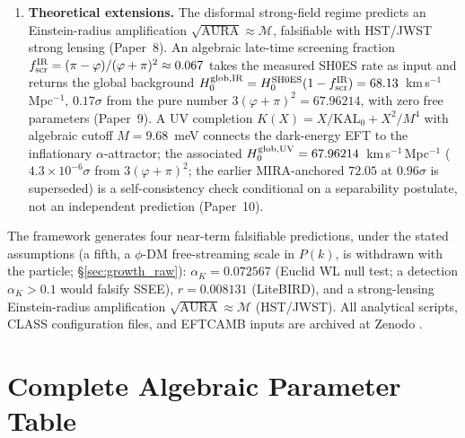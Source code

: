 \documentclass[12pt,a4paper]{article}
\newcommand{\phiG}{\varphi}
\newcommand{\KAL}{\mathrm{KAL}_0}
\newcommand{\MIRA}{\mathcal{M}}
\newcommand{\AURA}{\mathrm{AURA}}
\newcommand{\fscr}{f_{\mathrm{scr}}}
\newcommand{\alphaK}{\alpha_K}
\begin{document}
\begin{enumerate}[leftmargin=*,itemsep=2pt]
\item \textbf{Theoretical extensions.} The disformal strong-field regime predicts
  an Einstein-radius amplification $\sqrt{\AURA}\approx\MIRA$, falsifiable with
  HST/JWST strong lensing (Paper~8). An algebraic late-time screening fraction
  $\fscr^{\rm IR}=(\pi-\phiG)/(\phiG+\pi)^2\approx0.067$ takes the measured SH0ES
  rate as input and returns the global background
  $H_0^{\rm glob,IR}=H_0^{\rm SH0ES}(1-\fscr^{\rm IR})=68.13$~km\,s$^{-1}$\,Mpc$^{-1}$,
  $0.17\sigma$ from the pure number $3(\phiG+\pi)^2=67.96214$, with
  zero free parameters (Paper~9). A UV completion $K(X)=X/\KAL+X^2/M^4$ with
  algebraic cutoff $M=9.68$~meV connects the dark-energy EFT to the inflationary
  $\alpha$-attractor; the associated $H_0^{\rm glob,UV}=67.96214$~km\,s$^{-1}$\,Mpc$^{-1}$
  ($4.3{\times}10^{-6}\sigma$ from $3(\varphi+\pi)^2$; the earlier MIRA-anchored $72.05$ at $0.96\sigma$ is superseded)
  is a self-consistency check conditional on a separability postulate, not an
  independent prediction (Paper~10).
\end{enumerate}

The framework generates four near-term falsifiable predictions, under the stated
assumptions (a fifth, a $\phi$-DM free-streaming scale in $P(k)$, is withdrawn
with the particle; \S\ref{sec:growth_raw}): $\alphaK = 0.072567$ (Euclid WL null test; a detection $\alphaK > 0.1$ would
falsify SSEE), $r = 0.008131$ (LiteBIRD), and a strong-lensing Einstein-radius
amplification $\sqrt{\AURA}\approx\MIRA$ (HST/JWST).
All analytical scripts, CLASS configuration files, and EFTCAMB inputs are archived
at Zenodo \citep{AlmeidaSSEE2026zenodo}.

\appendix
\section{Complete Algebraic Parameter Table}
\label{app:params}
\end{document}
